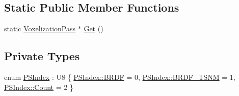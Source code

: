 \subsection*{Static Public Member Functions}
\begin{DoxyCompactItemize}
\item 
static \hyperlink{classmage_1_1_voxelization_pass}{Voxelization\+Pass} $\ast$ \hyperlink{classmage_1_1_voxelization_pass_a2f7a0a3c69d008f241a46b4f333add37}{Get} ()
\end{DoxyCompactItemize}
\subsection*{Private Types}
\begin{DoxyCompactItemize}
\item 
enum \hyperlink{classmage_1_1_voxelization_pass_a3632bab7b0039dbbe10569618ae57589}{P\+S\+Index} \+: U8 \{ \hyperlink{classmage_1_1_voxelization_pass_a3632bab7b0039dbbe10569618ae57589a4e69f1c58994758054563aa7392ffa4c}{P\+S\+Index\+::\+B\+R\+DF} = 0, 
\hyperlink{classmage_1_1_voxelization_pass_a3632bab7b0039dbbe10569618ae57589a12126b75c3073e66dcaed7ac43317a00}{P\+S\+Index\+::\+B\+R\+D\+F\+\_\+\+T\+S\+NM} = 1, 
\hyperlink{classmage_1_1_voxelization_pass_a3632bab7b0039dbbe10569618ae57589ae93f994f01c537c4e2f7d8528c3eb5e9}{P\+S\+Index\+::\+Count} = 2
 \}
\end{DoxyCompactItemize}
